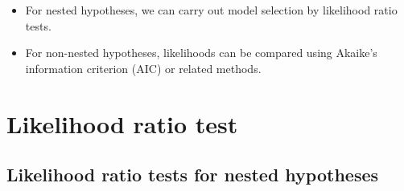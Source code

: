 \documentclass[
  letterpaper,
  DIV=11,
  numbers=noendperiod]{scrartcl}
\providecommand{\tightlist}{%
  \setlength{\itemsep}{0pt}\setlength{\parskip}{0pt}}\usepackage{longtable,booktabs,array}
\begin{document}
\begin{itemize}
\tightlist
\item
  For nested hypotheses, we can carry out model selection by likelihood
  ratio tests.
\item
  For non-nested hypotheses, likelihoods can be compared using Akaike's
  information criterion (AIC) or related methods.
\end{itemize}

\hypertarget{likelihood-ratio-test}{%
\section{Likelihood ratio test}\label{likelihood-ratio-test}}

\hypertarget{likelihood-ratio-tests-for-nested-hypotheses}{%
\subsection{Likelihood ratio tests for nested
hypotheses}\label{likelihood-ratio-tests-for-nested-hypotheses}}
\end{document}
